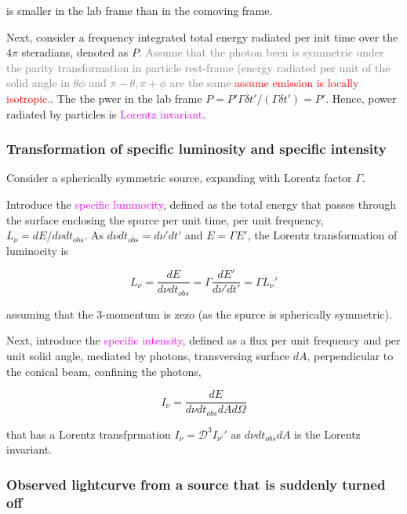 \documentclass[11pt,a4paper,headinclude=true,DIV=14,BCOR=8mm,chapterprefix,listof=totoc,twoside,openright,abstracton]{scrbook}
\newcommand{\red}[1]{\textcolor{red}{#1}}
\newcommand{\magenta}[1]{\textcolor{magenta}{#1}} %
\newcommand{\gray}[1]{\textcolor{gray}{#1}}
\begin{document}
is smaller in the lab frame than in the comoving frame.

Next, consider a frequency integrated total energy radiated per init time over the $4\pi$ steradians, denoted as $P$. \gray{Assume that the photon been is symmetric under the parity transformation in particle rest-frame (energy radiated per unit of the solid angle in $\theta\phi$ and $\pi-\theta,\pi+\phi$ are the same} \red{assume emission is locally isotropic.}.
The the pwer in the lab frame $P = P'\Gamma\delta t'/(\Gamma\delta t') = P'$. Hence, power radiated by particles is \magenta{Lorentz invariant}.


\subsubsection{Transformation of specific luminosity and specific intensity}

Consider a spherically symmetric source, expanding with Lorentz factor $\Gamma$. 

Introduce the \magenta{specific luminocity}, defined as the total energy that passes through the surface enclosing the spurce per unit time, per unit frequency, $L_{\nu} = dE / d\nu dt_{obs}$. 
As $d\nu dt_{obs} = d\nu' dt'$ and $E=\Gamma E'$, the Lorentz transformation of luminocity is

\begin{equation}
    L_{\nu} = \frac{dE}{d\nu dt_{obs}} = \Gamma \frac{dE'}{d\nu' dt'} = \Gamma L_{\nu}'
\end{equation}

 assuming that the $3$-momentum is zezo (as the spurce is spherically symmetric).

Next, introduce the \magenta{specific intensity}, defined as a flux per unit frequency and per unit solid angle, mediated by photons, transversing surface $dA$, perpendicular to the conical beam, confining the photons, 

\begin{equation}
    I_{\nu} = \frac{dE}{d\nu dt_{obs} dA d\Omega}
\end{equation}

that has a Lorentz transfprmation $I_{\nu} = \mathcal{D}^3 I_{\nu'}'$ as $d\nu dt_{obs} dA$ is the Lorentz invariant.


\subsubsection{Observed lightcurve from a source that is suddenly turned off}
\end{document}
